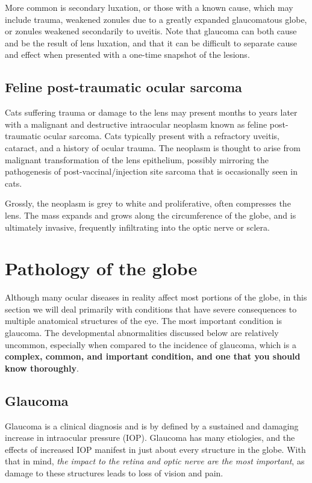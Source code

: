 \documentclass[openany]{article}
\begin{document}
More common is secondary luxation, or those with a known cause, which
may include trauma, weakened zonules due to a greatly expanded
glaucomatous globe, or zonules weakened secondarily to uveitis. Note
that glaucoma can both cause and be the result of lens luxation, and
that it can be difficult to separate cause and effect when presented
with a one-time snapshot of the lesions.

\subsection{Feline post-traumatic ocular
sarcoma}\label{feline-post-traumatic-ocular-sarcoma}

Cats suffering trauma or damage to the lens may present months to years
later with a malignant and destructive intraocular neoplasm known as
feline post-traumatic ocular sarcoma. Cats typically present with a
refractory uveitis, cataract, and a history of ocular trauma. The
neoplasm is thought to arise from malignant transformation of the lens
epithelium, possibly mirroring the pathogenesis of
post-vaccinal/injection site sarcoma that is occasionally seen in cats.

Grossly, the neoplasm is grey to white and proliferative, often
compresses the lens. The mass expands and grows along the circumference
of the globe, and is ultimately invasive, frequently infiltrating into
the optic nerve or sclera.

\section{Pathology of the globe}\label{pathology-of-the-globe}

Although many ocular diseases in reality affect most portions of the
globe, in this section we will deal primarily with conditions that have
severe consequences to multiple anatomical structures of the eye. The
most important condition is glaucoma. The developmental abnormalities
discussed below are relatively uncommon, especially when compared to the
incidence of glaucoma, which is a \textbf{complex, common, and important
condition, and one that you should know thoroughly}.

\hypertarget{glaucoma}{\subsection{Glaucoma}\label{glaucoma}}

Glaucoma is a clinical diagnosis and is by defined by a sustained and
damaging increase in intraocular pressure (IOP). Glaucoma has many
etiologies, and the effects of increased IOP manifest in just about
every structure in the globe. With that in mind, \emph{the impact to the
retina and optic nerve are the most important}, as damage to these
structures leads to loss of vision and pain.
\end{document}
